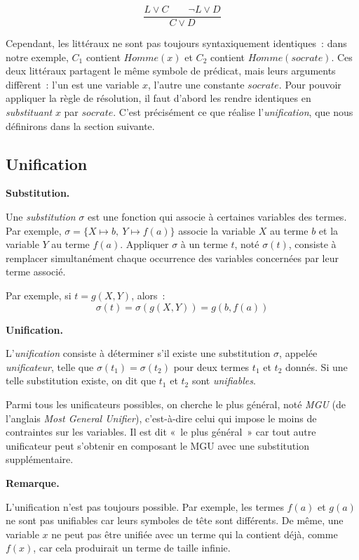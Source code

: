 \documentclass[11pt]{article}
\newenvironment{paraph}[1]{%
  \medskip
  \noindent\textbf{#1.}\quad

  \vspace{0.2cm}
}{%
  \medskip
}
\newenvironment{remarque}{%
    \begin{mdframed}[
        linecolor=sectioncolor!40,
        linewidth=0.8pt,
        backgroundcolor=sectioncolor!5,
        innerleftmargin=10pt,
        innerrightmargin=10pt,
        innertopmargin=6pt,
        innerbottommargin=6pt,
        skipabove=8pt,
        skipbelow=8pt
    ]
    \noindent\textbf{\small\color{sectioncolor}Remarque.}\enspace\small\itshape
}{%
    \end{mdframed}
}
\begin{document}
\[
    \frac{L \vee C \qquad \neg L \vee D}{C \vee D}
\]

\vspace{0.2cm}
Cependant, les littéraux ne sont pas toujours syntaxiquement identiques~: 
dans notre exemple, $C_1$ contient $\mathit{Homme}(x)$ et $C_2$ contient 
$\mathit{Homme}(\mathit{socrate})$. Ces deux littéraux partagent le même 
symbole de prédicat, mais leurs arguments diffèrent~: l'un est une variable 
$x$, l'autre une constante $\mathit{socrate}$. Pour pouvoir appliquer 
la règle de résolution, il faut d'abord les rendre identiques en 
\textit{substituant} $x$ par $\mathit{socrate}$. C'est précisément ce 
que réalise l'\textit{unification}, que nous définirons dans la section suivante.

\subsection{Unification}
\begin{paraph}{Substitution}
Une \textit{substitution} $\sigma$ est une fonction qui associe à 
certaines variables des termes. Par exemple, $\sigma = \{X \mapsto b,\ Y \mapsto f(a)\}$ 
associe la variable $X$ au terme $b$ et la variable $Y$ au terme 
$f(a)$. Appliquer $\sigma$ à un terme $t$, noté $\sigma(t)$, 
consiste à remplacer simultanément chaque occurrence des variables 
concernées par leur terme associé.

\vspace{0.2cm}
Par exemple, si $t = g(X, Y)$, alors~:
\[
    \sigma(t) = \sigma(g(X, Y)) = g(b, f(a))
\]
\end{paraph}

\begin{paraph}{Unification}
L'\textit{unification} consiste à déterminer s'il existe 
une substitution $\sigma$, appelée \textit{unificateur}, 
telle que $\sigma(t_1) = \sigma(t_2)$ pour deux termes 
$t_1$ et $t_2$ donnés. Si une telle substitution existe, 
on dit que $t_1$ et $t_2$ sont \textit{unifiables}.

\vspace{0.2cm}
Parmi tous les unificateurs possibles, 
on cherche le plus général, noté \textit{MGU} (de l'anglais 
\textit{Most General Unifier}), c'est-à-dire celui qui 
impose le moins de contraintes sur les variables. Il est 
dit «~le plus général~» car tout autre unificateur peut 
s'obtenir en composant le MGU avec une substitution supplémentaire.
\end{paraph}

\begin{remarque}
    L'unification n'est pas toujours possible. Par exemple, les termes $f(a)$ et $g(a)$ ne sont pas unifiables car leurs symboles de tête sont différents. De même, une variable $x$ ne peut pas être unifiée avec un terme qui la contient déjà, comme $f(x)$, car cela produirait un terme de taille infinie.
\end{remarque}
\end{document}
